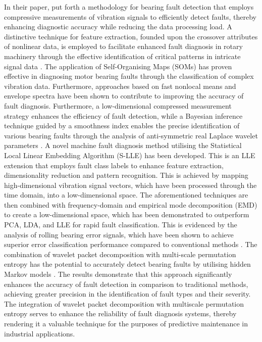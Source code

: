 \documentclass[sn-basic,pdflatex]{sn-jnl}
\theoremstyle{remark}
\theoremstyle{definition}
\begin{document}
In their paper, \citet{WOS:000335959500009} put forth a methodology for
bearing fault detection that employs compressive measurements of
vibration signals to efficiently detect faults, thereby enhancing
diagnostic accuracy while reducing the data processing load. A
distinctive technique for feature extraction, founded upon the crossover
attributes of nonlinear data, is employed to facilitate enhanced fault
diagnosis in rotary machinery through the effective identification of
critical patterns in intricate signal data \citep{WOS:000338603900013}.
The application of Self-Organising Maps (SOMs) has proven effective in
diagnosing motor bearing faults through the classification of complex
vibration data. Furthermore, approaches based on fast nonlocal means and
envelope spectra have been shown to contribute to improving the accuracy
of fault diagnosis. Furthermore, a low-dimensional compressed
measurement strategy enhances the efficiency of fault detection, while a
Bayesian inference technique guided by a smoothness index enables the
precise identification of various bearing faults through the analysis of
anti-symmetric real Laplace wavelet parameters
\citep{WOS:000380543400119, WOS:000348309400067, WOS:000354607100016, WOS:000350998800016}.
A novel machine fault diagnosis method utilising the Statistical Local
Linear Embedding Algorithm (S-LLE) has been developed. This is an LLE
extension that employs fault class labels to enhance feature extraction,
dimensionality reduction and pattern recognition. This is achieved by
mapping high-dimensional vibration signal vectors, which have been
processed through the time domain, into a low-dimensional space. The
aforementioned techniques are then combined with frequency-domain and
empirical mode decomposition (EMD) to create a low-dimensional space,
which has been demonstrated to outperform PCA, LDA, and LLE for rapid
fault classification. This is evidenced by the analysis of rolling
bearing error signals, which have been shown to achieve superior error
classification performance compared to conventional methods
\citep{WOS:000361788200068}. The combination of wavelet packet
decomposition with multi-scale permutation entropy has the potential to
accurately detect bearing faults by utilising hidden Markov models
\citep{WOS:000362513400031}. The results demonstrate that this approach
significantly enhances the accuracy of fault detection in comparison to
traditional methods, achieving greater precision in the identification
of fault types and their severity. The integration of wavelet packet
decomposition with multiscale permutation entropy serves to enhance the
reliability of fault diagnosis systems, thereby rendering it a valuable
technique for the purposes of predictive maintenance in industrial
applications.
\end{document}
